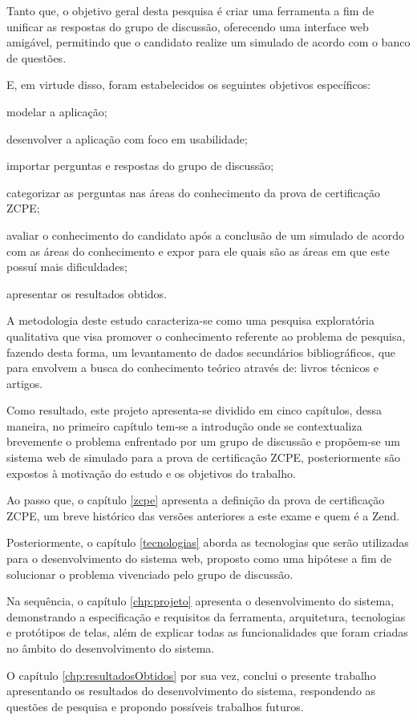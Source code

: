 
Tanto que, o objetivo geral desta pesquisa é criar uma ferramenta a fim de
unificar as respostas do grupo de discussão, oferecendo uma interface web
amigável, permitindo que o candidato realize um simulado de
acordo com o banco de questões.


E, em virtude disso, foram estabelecidos os seguintes objetivos
específicos:

\begin{alineas}
    \item modelar a aplicação;
    \item desenvolver a aplicação com foco em usabilidade;
    \item importar perguntas e respostas do grupo de discussão;
    \item categorizar as perguntas nas áreas do conhecimento da prova de
    certificação \acs{ZCPE};
    \item avaliar o conhecimento do candidato após a conclusão de um simulado
    de acordo com as áreas do conhecimento e expor para ele quais são as áreas  em
    que este possuí mais dificuldades;
    \item apresentar os resultados obtidos.
\end{alineas}


A metodologia deste estudo caracteriza-se como uma pesquisa exploratória
qualitativa que visa promover o conhecimento referente ao problema de pesquisa, fazendo desta forma,
um levantamento de dados secundários bibliográficos, que para
 envolvem a busca do conhecimento
teórico através de: livros técnicos e artigos.

Como resultado, este projeto apresenta-se dividido em cinco capítulos, dessa
maneira, no primeiro capítulo tem-se a introdução onde se contextualiza 
brevemente o problema enfrentado por um grupo de discussão e propõem-se um 
sistema web de simulado para a prova de certificação \acs{ZCPE}, 
posteriormente são expostos à motivação do estudo e os objetivos do trabalho.

Ao passo que, o capítulo \ref{zcpe} apresenta a definição da prova de
certificação \acl{ZCPE}, um breve histórico das versões anteriores a este
exame e quem é a \acs{Zend}.

Posteriormente, o capítulo \ref{tecnologias} aborda as tecnologias que serão
utilizadas para o desenvolvimento do sistema web, proposto como uma hipótese
a fim de solucionar o problema vivenciado pelo grupo de discussão.

Na sequência, o capítulo \ref{chp:projeto} apresenta o desenvolvimento do
sistema, demonstrando a especificação e requisitos da ferramenta, arquitetura,
tecnologias e protótipos de telas, além de explicar todas as funcionalidades
que foram criadas no âmbito do desenvolvimento do sistema.

O capítulo \ref{chp:resultadosObtidos} por sua vez, conclui o presente trabalho
apresentando os resultados do desenvolvimento do sistema, respondendo as
questões de pesquisa e propondo possíveis trabalhos futuros.